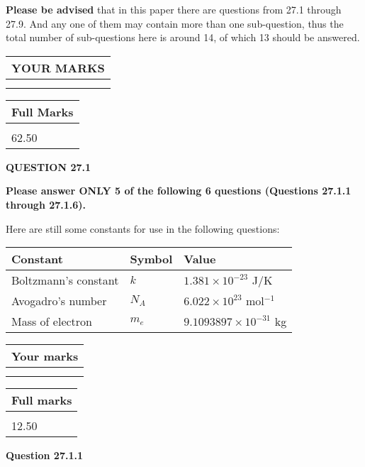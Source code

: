 \documentclass[12pt]{article}
\begin{document}
 
{\textbf{\large{Please be advised}}} that in this paper there are questions from
27.1 through
27.9.
And any one of them may contain more than one sub-question, thus the total number
of sub-questions here is around 14, of which
13 should be answered.
 
\vspace{0.3in}
 
 
   
   
  
\vspace{0.2in}
  
\noindent\begin{tabular}{|l|}
\hline
 YOUR MARKS  \\
\hline
 \\ 
 \\ 
\hline
\end{tabular}
\hspace{0.05in} \begin{tabular}{|l|}
\hline
 Full Marks  \\
\hline
 \\ 
62.50 \\
\hline
\end{tabular}
{\textbf{\Large{QUESTION
27.1 
}}}
  
  
 
{\textbf{\Large{Please answer ONLY
5 of the following
6 questions (Questions
27.1.1 through
27.1.6). }}}
 
Here are still some constants for use in the following questions:
 
 
\noindent\begin{tabular}{|l|l|l|}
\hline
Constant & Symbol & Value \\
\hline
 
Boltzmann's constant &
$k$ &
 $ 1.381 \times 10^{-23} $
J/K \\
\hline
 
Avogadro's number &
$N_A$ &
 $ 6.022 \times 10^{23} $
mol$^{-1}$ \\
\hline
 
Mass of electron &
$m_e$ &
 $ 9.1093897 \times 10^{-31} $
kg \\
\hline
 
\end{tabular}
 
  
\vspace{0.2in}
  
         \begin{tabular}{|l|}
\hline
 Your marks  \\
\hline
 \\ 
 \\ 
\hline
\end{tabular}
\hspace{0.05in} \begin{tabular}{|l|}
\hline
 Full marks  \\
\hline
 \\ 
12.50 \\
\hline
\end{tabular}
{\textbf{\Large{Question
27.1.1 
}}}
  
\end{document}
